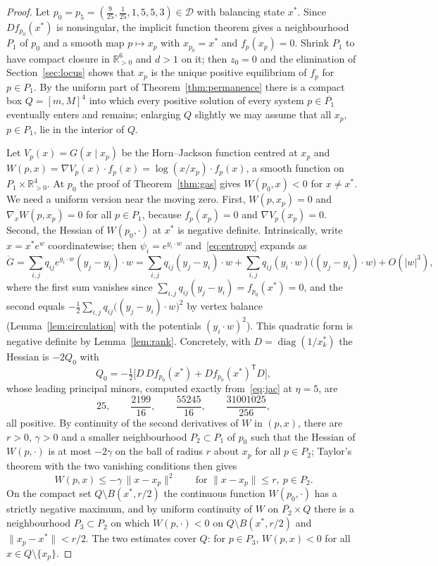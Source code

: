 \documentclass[11pt,a4paper]{article}
\theoremstyle{plain}
\theoremstyle{definition}
\theoremstyle{remark}
\newcommand{\R}{\mathbb{R}}
\newcommand{\Rp}{\R_{>0}}
\newcommand{\DT}{\mathcal{D}}
\newcommand{\xs}{x^{*}}
\newcommand{\diag}{\operatorname{diag}}
\begin{document}
\begin{proof}
Let $p_0=p_5=(\tfrac9{25},\tfrac1{25},1,5,5,3)\in\DT$ with balancing state $\xs$. Since $Df_{p_0}(\xs)$ is nonsingular, the implicit function theorem gives a neighbourhood $P_1$ of $p_0$ and a smooth map $p\mapsto x_p$ with $x_{p_0}=\xs$ and $f_p(x_p)=0$. Shrink $P_1$ to have compact closure in $\Rp^6$ and $d>1$ on it; then $z_0=0$ and the elimination of Section~\ref{sec:locus} shows that $x_p$ is the unique positive equilibrium of $f_p$ for $p\in P_1$. By the uniform part of Theorem~\ref{thm:permanence} there is a compact box $Q=[m,M]^4$ into which every positive solution of every system $p\in\overline{P_1}$ eventually enters and remains; enlarging $Q$ slightly we may assume that all $x_p$, $p\in P_1$, lie in the interior of $Q$.

Let $V_p(x)=G(x\mid x_p)$ be the Horn--Jackson function centred at $x_p$ and $W(p,x)=\nabla V_p(x)\cdot f_p(x)=\log(x/x_p)\cdot f_p(x)$, a smooth function on $P_1\times\Rp^4$. At $p_0$ the proof of Theorem~\ref{thm:gas} gives $W(p_0,x)<0$ for $x\ne\xs$. We need a uniform version near the moving zero. First, $W(p,x_p)=0$ and $\nabla_xW(p,x_p)=0$ for all $p\in P_1$, because $f_p(x_p)=0$ and $\nabla V_p(x_p)=0$. Second, the Hessian of $W(p_0,\cdot)$ at $\xs$ is negative definite. Intrinsically, write $x=\xs e^{w}$ coordinatewise; then $\psi_i=e^{y_i\cdot w}$ and~\eqref{eq:entropy} expands as
\[
\dot G=\sum_{i,j}q_{ij}e^{y_i\cdot w}(y_j-y_i)\cdot w
=\sum_{i,j}q_{ij}(y_j-y_i)\cdot w+\sum_{i,j}q_{ij}(y_i\cdot w)\bigl((y_j-y_i)\cdot w\bigr)+O(|w|^3),
\]
where the first sum vanishes since $\sum_{i,j}q_{ij}(y_j-y_i)=f_{p_0}(\xs)=0$, and the second equals $-\tfrac12\sum_{i,j}q_{ij}\bigl((y_j-y_i)\cdot w\bigr)^2$ by vertex balance (Lemma~\ref{lem:circulation} with the potentials $(y_i\cdot w)^2$). This quadratic form is negative definite by Lemma~\ref{lem:rank}. Concretely, with $D=\diag(1/x_k^*)$ the Hessian is $-2Q_0$ with
\[
Q_0=-\tfrac12\bigl[D\,Df_{p_0}(\xs)+Df_{p_0}(\xs)^{\mathsf T}D\bigr],
\]
whose leading principal minors, computed exactly from~\eqref{eq:jac} at $\eta=5$, are
\begin{equation}\label{eq:minors}
25,\qquad \frac{2199}{16},\qquad \frac{55245}{16},\qquad \frac{31001025}{256},
\end{equation}
all positive. By continuity of the second derivatives of $W$ in $(p,x)$, there are $r>0$, $\gamma>0$ and a smaller neighbourhood $P_2\subset P_1$ of $p_0$ such that the Hessian of $W(p,\cdot)$ is at most $-2\gamma$ on the ball of radius $r$ about $x_p$ for all $p\in P_2$; Taylor's theorem with the two vanishing conditions then gives
\[
W(p,x)\le-\gamma\,\|x-x_p\|^2\qquad\text{for }\|x-x_p\|\le r,\ p\in P_2 .
\]
On the compact set $Q\setminus B(\xs,r/2)$ the continuous function $W(p_0,\cdot)$ has a strictly negative maximum, and by uniform continuity of $W$ on $\overline{P_2}\times Q$ there is a neighbourhood $P_3\subset P_2$ on which $W(p,\cdot)<0$ on $Q\setminus B(\xs,r/2)$ and $\|x_p-\xs\|<r/2$. The two estimates cover $Q$: for $p\in P_3$, $W(p,x)<0$ for all $x\in Q\setminus\{x_p\}$.


\end{proof}
\end{document}
